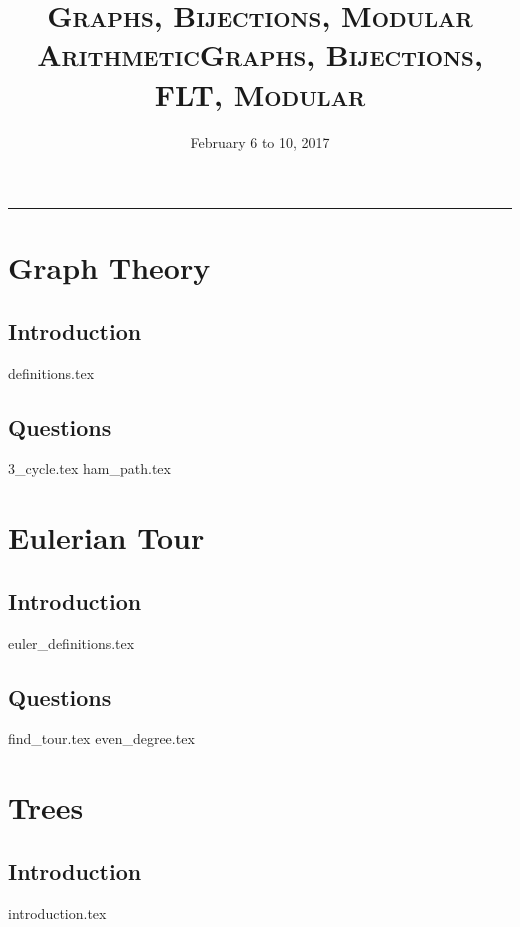 \documentclass{exam}
\title{\textsc{Graphs, Bijections, Modular Arithmetic}}
\title{\textsc{Graphs, Bijections, FLT, Modular}}
\date{February 6 to 10, 2017}
\begin{document}
\maketitle
\rule{\textwidth}{0.15em}
\fontsize{12}{15}\selectfont
\thispagestyle{empty}

\section{Graph Theory}
\subsection{Introduction}
\begin{questions}
{definitions.tex}
\end{questions}

\subsection{Questions}
\begin{questions}
{3_cycle.tex}
{ham_path.tex}
\end{questions}

\section{Eulerian Tour}
\subsection{Introduction}
{euler_definitions.tex}
\subsection{Questions}
\begin{questions}
{find_tour.tex}
{even_degree.tex}
\end{questions}

\section{Trees}
\subsection{Introduction}
{introduction.tex}
\newpage
\end{document}

